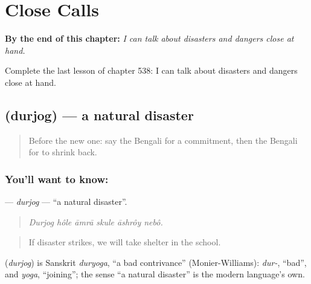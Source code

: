 
\chapter{Close Calls}
\label{ch:bn-close-calls}

\begin{chapteropening}
\textbf{By the end of this chapter:} \emph{I can talk about disasters and dangers close at hand.}

Complete the last lesson of chapter 538: I can talk about disasters and dangers close at hand.
\end{chapteropening}

\section[\texorpdfstring{\bn{দুর্যোগ} (durjog)}{দুর্যোগ (durjog)}]{ (durjog) — a natural disaster}

\label{lesson:BN-C538-durjog}



\begin{quote}
Before the new one: say the Bengali for a commitment, then the Bengali for to shrink back.
\end{quote}

\subsection*{You'll want to know: }
\textbf{} — \emph{durjog} — \textquotedblleft{}a natural disaster\textquotedblright{}.

\begin{quote}
     
\end{quote}

\begin{quote}
\emph{Durjog hôle āmrā skule āshrôy nebô.}
\end{quote}

\begin{quote}
If disaster strikes, we will take shelter in the school.
\end{quote}

\begin{cousinweb}
\textbf{} (\emph{durjog}) is Sanskrit \emph{duryoga}, \textquotedblleft{}a bad contrivance\textquotedblright{} (Monier-Williams): \emph{dur-}, \textquotedblleft{}bad\textquotedblright{}, and \emph{yoga}, \textquotedblleft{}joining\textquotedblright{}; the sense \textquotedblleft{}a natural disaster\textquotedblright{} is the modern language's own.
\end{cousinweb}

